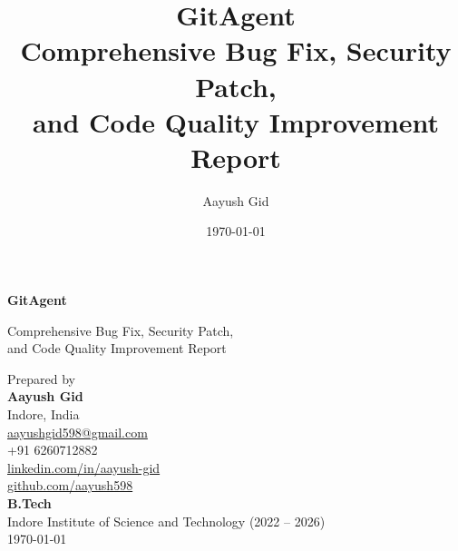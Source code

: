 \documentclass[12pt,a4paper,twoside]{report}
\begin{document}
\title{\Huge\textbf{GitAgent}\\[0.3cm]
\LARGE Comprehensive Bug Fix, Security Patch,\\and Code Quality Improvement Report}
\author{Aayush Gid}
\date{\today}

\begin{titlepage}
\centering
\vspace*{2cm}
{\Huge\textbf{GitAgent}\par}
\vspace{0.3cm}
{\LARGE Comprehensive Bug Fix, Security Patch,\\and Code Quality Improvement Report\par}
\vspace{2cm}
{\Large Prepared by}\\
\vspace{0.3cm}
{\Huge\textbf{Aayush Gid}}\\
\vspace{0.3cm}
{\large Indore, India}\\
{\large \href{mailto:aayushgid598@gmail.com}{aayushgid598@gmail.com}}\\
{\large +91 6260712882}\\
\vspace{0.3cm}
{\large \href{https://linkedin.com/in/aayush-gid}{linkedin.com/in/aayush-gid}}\\
{\large \href{https://github.com/aayush598}{github.com/aayush598}}\\
\vspace{0.5cm}
{\large \textbf{B.Tech}}\\
{\large Indore Institute of Science and Technology (2022 -- 2026)}\\
\vspace{1cm}
{\large \today}
\end{titlepage}

\tableofcontents
\newpage
















\end{document}
